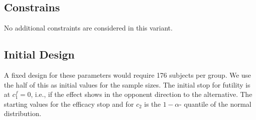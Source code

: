 \documentclass[]{book}
\newenvironment{Shaded}{\begin{snugshade}}{\end{snugshade}}
\newcommand{\ControlFlowTok}[1]{\textcolor[rgb]{0.13,0.29,0.53}{\textbf{#1}}}
\newcommand{\DataTypeTok}[1]{\textcolor[rgb]{0.13,0.29,0.53}{#1}}
\newcommand{\DecValTok}[1]{\textcolor[rgb]{0.00,0.00,0.81}{#1}}
\newcommand{\FloatTok}[1]{\textcolor[rgb]{0.00,0.00,0.81}{#1}}
\newcommand{\KeywordTok}[1]{\textcolor[rgb]{0.13,0.29,0.53}{\textbf{#1}}}
\newcommand{\NormalTok}[1]{#1}
\newcommand{\OperatorTok}[1]{\textcolor[rgb]{0.81,0.36,0.00}{\textbf{#1}}}
\newcommand{\StringTok}[1]{\textcolor[rgb]{0.31,0.60,0.02}{#1}}
\begin{document}
\hypertarget{constrains-10}{%
\subsection{Constrains}\label{constrains-10}}

No additional constraints are considered in this variant.

\hypertarget{initial-design-9}{%
\subsection{Initial Design}\label{initial-design-9}}

A fixed design for these parameters would require
176
subjects per group. We use the half of this as initial values for the
sample sizes.
The initial stop for futility is at \(c_1^f=0\), i.e., if the effect shows
in the opponent direction to the alternative.
The starting values for the efficacy stop and for \(c_2\) is the \(1-\alpha\)-
quantile of the normal distribution.

\begin{Shaded}
\end{Shaded}
\end{document}
